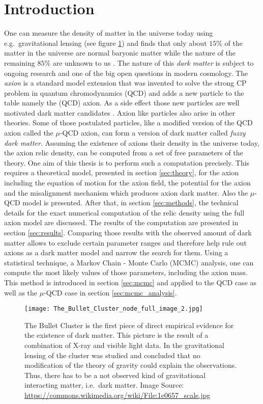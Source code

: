 \documentclass[twoside,a4paper, 12pt]{article}
\numberwithin{equation}{section}
\begin{document}
\section{Introduction}
\setcounter{page}{1}


One can measure the density of matter in the universe today using e.g.\
gravitational lensing (see figure \ref{fig:bullet_cluster}) and finds that only about $15\%$ of the matter in the universe 
are normal baryonic matter while the nature of the remaining $85\%$ are unknown to us \cite{BulletClusterDarkMatter}.
The nature of this \emph{dark matter} is subject to ongoing research and
one of the big open questions in modern cosmology.
The \emph{axion} is a standard model extension that was invented to solve the strong CP
problem in quantum chromodynamics (QCD) and adds a new particle to the table namely the (QCD) axion.
As a side effect those new particles are well motivated dark matter candidates \cite{AxionCosmoRev}.
Axion like particles also arise in other theories. %
Some of those postulated particles, like a modified version of the QCD axion called the $\mu$-QCD axion, can form a version of dark matter called \emph{fuzzy dark matter}.
Assuming the existence of axions their density in the universe today, the axion relic density, can be computed from a set of free parameters of the theory.
One aim of this thesis is to perform such a computation precisely.
This requires a theoretical model, presented in section \ref{sec:theory}, for the axion including 
the equation of motion for the axion field, the potential for the axion and 
the misalignment mechanism which produces axion dark matter. Also the $\mu$-QCD model is presented.
After that, in section \ref{sec:methods}, the technical details for the exact numerical computation of the relic 
density using the full axion model are discussed. 
The results of the computation are presented in section \ref{sec:results}.
Comparing those results with the observed amount of dark matter allows to exclude certain
parameter ranges and therefore help rule out axions as a dark matter model and narrow the search for them. 
Using a statistical technique, a Markov Chain - Monte Carlo (MCMC) analysis, 
one can compute the most likely values of those parameters,  including the axion mass. 
This method is introduced in section \ref{sec:mcmc} and applied to the QCD case as well as 
the $\mu$-QCD case in section \ref{sec:mcmc_analysis}.
\begin{figure}[H]
    \centering
    \texttt{[image: The\_Bullet\_Cluster\_node\_full\_image\_2.jpg]}
    \caption{The Bullet Cluster is the first piece of direct empirical evidence for
    the existence of dark matter. This picture is the result of a combination of X-ray and visible
    light data. In \cite{BulletClusterDarkMatter} the gravitational lensing of the cluster was studied and concluded that
    no modification of the theory of gravity could explain the observations.
    Thus, there has to be a not observed kind of gravitational interacting matter, i.e.\ dark
    matter. Image Source: \url{https://commons.wikimedia.org/wiki/File:1e0657_scale.jpg}
    }
    \label{fig:bullet_cluster}
\end{figure}
\end{document}
